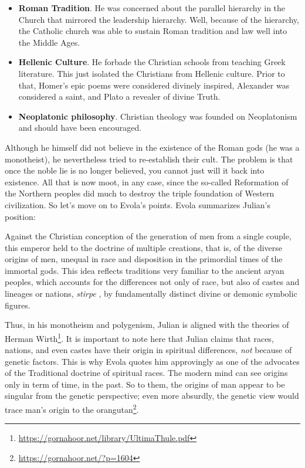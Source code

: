 \begin{itemize}


\item \textbf{Roman Tradition}. He was concerned about the parallel hierarchy in the Church that mirrored the leadership hierarchy. Well, because of the hierarchy, the Catholic church was able to sustain Roman tradition and law well into the Middle Ages.

\item \textbf{Hellenic Culture}. He forbade the Christian schools from teaching Greek literature. This just isolated the Christians from Hellenic culture. Prior to that, Homer's epic poems were considered divinely inspired, Alexander was considered a saint, and Plato a revealer of divine Truth.

\item \textbf{Neoplatonic philosophy}. Christian theology was founded on Neoplatonism and should have been encouraged.
\end{itemize}


Although he himself did not believe in the existence of the Roman gods (he was a monotheist), he nevertheless tried to re-establish their cult. The problem is that once the noble lie is no longer believed, you cannot just will it back into existence. All that is now moot, in any case, since the so-called Reformation of the Northern peoples did much to destroy the triple foundation of Western civilization. So let's move on to Evola's points. Evola summarizes Julian's position:

\begin{quotex}
Against the Christian conception of the generation of men from a single couple, this emperor held to the doctrine of multiple creations, that is, of the diverse origins of men, unequal in race and disposition in the primordial times of the immortal gods. This idea reflects traditions very familiar to the ancient aryan peoples, which accounts for the differences not only of race, but also of castes and lineages or nations, \emph{stirpe} , by fundamentally distinct divine or demonic symbolic figures.
\end{quotex}


Thus, in his monotheism and polygenism, Julian is aligned with the theories of Herman Wirth\footnote{\url{https://gornahoor.net/library/UltimaThule.pdf}}. It is important to note here that Julian claims that races, nations, and even castes have their origin in spiritual differences, \emph{not} because of genetic factors. This is why Evola quotes him approvingly as one of the advocates of the Traditional doctrine of spiritual races. The modern mind can see origins only in term of time, in the past. So to them, the origins of man appear to be singular from the genetic perspective; even more absurdly, the genetic view would trace man's origin to the orangutan\footnote{\url{https://gornahoor.net/?p=1604}}.

